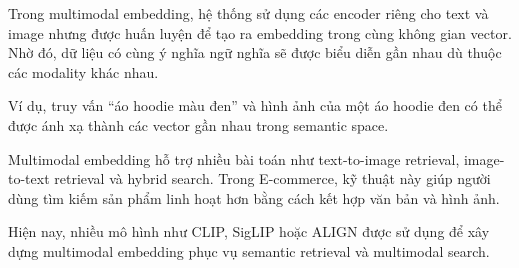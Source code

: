Trong multimodal embedding, hệ thống sử dụng các encoder riêng cho text và image nhưng được huấn luyện để tạo ra embedding trong cùng không gian vector. Nhờ đó, dữ liệu có cùng ý nghĩa ngữ nghĩa sẽ được biểu diễn gần nhau dù thuộc các modality khác nhau.

Ví dụ, truy vấn ``áo hoodie màu đen'' và hình ảnh của một áo hoodie đen có thể được ánh xạ thành các vector gần nhau trong semantic space.

Multimodal embedding hỗ trợ nhiều bài toán như text-to-image retrieval, image-to-text retrieval và hybrid search. Trong E-commerce, kỹ thuật này giúp người dùng tìm kiếm sản phẩm linh hoạt hơn bằng cách kết hợp văn bản và hình ảnh.

Hiện nay, nhiều mô hình như CLIP, SigLIP hoặc ALIGN được sử dụng để xây dựng multimodal embedding phục vụ semantic retrieval và multimodal search.




